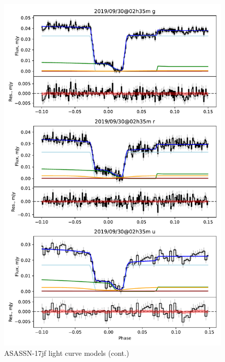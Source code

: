 \begin{figure}
    \centering
    \includegraphics[width=\textwidth]{figures/results/three_cvs_with_weird_colours/ASASSN-17jf/ASASSN-17jf_2.pdf}
    \caption{ASASSN-17jf light curve models (cont.)}
    \label{fig:ASASSN-17jf all light curves cont 1}
\end{figure}
